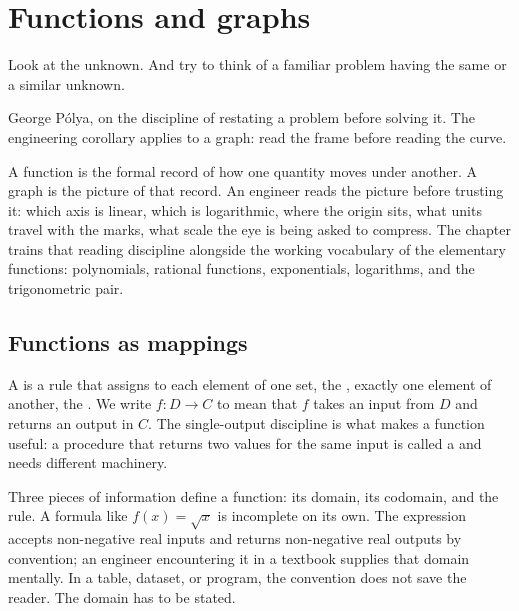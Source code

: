 \chapter{Functions and graphs}
\label{vol02:ch02}

\epigraph{Look at the unknown. And try to think of a familiar
problem having the same or a similar unknown.}{George P\'olya, on the
discipline of restating a problem before solving it. The engineering
corollary applies to a graph: read the frame before reading the curve.}


\noindent
A function is the formal record of how one quantity moves under
another. A graph is the picture of that record. An engineer reads the
picture before trusting it: which axis is linear, which is
logarithmic, where the origin sits, what units travel with the marks,
what scale the eye is being asked to compress. The chapter trains
that reading discipline alongside the working vocabulary of the
elementary functions: polynomials, rational functions, exponentials,
logarithms, and the trigonometric pair.

\section{Functions as mappings}

A  is a rule that assigns to each element of one
set, the , exactly one element of another, the
. We write $f: D \to C$ to mean that $f$ takes an
input from $D$ and returns an output in $C$. The single-output
discipline is what makes a function useful: a procedure that returns
two values for the same input is called a  and
needs different machinery.

Three pieces of information define a function: its domain, its
codomain, and the rule. A formula like $f(x) = \sqrt{x}$ is incomplete
on its own. The expression accepts non-negative real inputs and
returns non-negative real outputs by convention; an engineer
encountering it in a textbook supplies that domain mentally. In a
table, dataset, or program, the convention does not save the reader.
The domain has to be stated.

